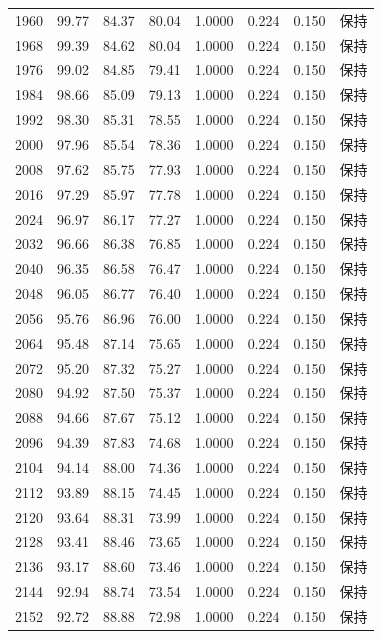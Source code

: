 \begin{longtable}{rrrrrrrr}
1960 & 99.77 & 84.37 & 80.04 & 1.0000 & 0.224 & 0.150 & 保持 \\
1968 & 99.39 & 84.62 & 80.04 & 1.0000 & 0.224 & 0.150 & 保持 \\
1976 & 99.02 & 84.85 & 79.41 & 1.0000 & 0.224 & 0.150 & 保持 \\
1984 & 98.66 & 85.09 & 79.13 & 1.0000 & 0.224 & 0.150 & 保持 \\
1992 & 98.30 & 85.31 & 78.55 & 1.0000 & 0.224 & 0.150 & 保持 \\
2000 & 97.96 & 85.54 & 78.36 & 1.0000 & 0.224 & 0.150 & 保持 \\
2008 & 97.62 & 85.75 & 77.93 & 1.0000 & 0.224 & 0.150 & 保持 \\
2016 & 97.29 & 85.97 & 77.78 & 1.0000 & 0.224 & 0.150 & 保持 \\
2024 & 96.97 & 86.17 & 77.27 & 1.0000 & 0.224 & 0.150 & 保持 \\
2032 & 96.66 & 86.38 & 76.85 & 1.0000 & 0.224 & 0.150 & 保持 \\
2040 & 96.35 & 86.58 & 76.47 & 1.0000 & 0.224 & 0.150 & 保持 \\
2048 & 96.05 & 86.77 & 76.40 & 1.0000 & 0.224 & 0.150 & 保持 \\
2056 & 95.76 & 86.96 & 76.00 & 1.0000 & 0.224 & 0.150 & 保持 \\
2064 & 95.48 & 87.14 & 75.65 & 1.0000 & 0.224 & 0.150 & 保持 \\
2072 & 95.20 & 87.32 & 75.27 & 1.0000 & 0.224 & 0.150 & 保持 \\
2080 & 94.92 & 87.50 & 75.37 & 1.0000 & 0.224 & 0.150 & 保持 \\
2088 & 94.66 & 87.67 & 75.12 & 1.0000 & 0.224 & 0.150 & 保持 \\
2096 & 94.39 & 87.83 & 74.68 & 1.0000 & 0.224 & 0.150 & 保持 \\
2104 & 94.14 & 88.00 & 74.36 & 1.0000 & 0.224 & 0.150 & 保持 \\
2112 & 93.89 & 88.15 & 74.45 & 1.0000 & 0.224 & 0.150 & 保持 \\
2120 & 93.64 & 88.31 & 73.99 & 1.0000 & 0.224 & 0.150 & 保持 \\
2128 & 93.41 & 88.46 & 73.65 & 1.0000 & 0.224 & 0.150 & 保持 \\
2136 & 93.17 & 88.60 & 73.46 & 1.0000 & 0.224 & 0.150 & 保持 \\
2144 & 92.94 & 88.74 & 73.54 & 1.0000 & 0.224 & 0.150 & 保持 \\
2152 & 92.72 & 88.88 & 72.98 & 1.0000 & 0.224 & 0.150 & 保持 \\

\end{longtable}
